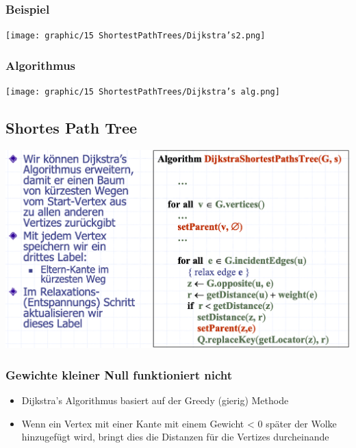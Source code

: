 \subsubsection{Beispiel}
\begin{center}
    \texttt{[image: graphic/15 ShortestPathTrees/Dijkstra’s2.png]}
\end{center}
\vspace{-8pt}

\subsubsection{Algorithmus}
\begin{center}
    \texttt{[image: graphic/15 ShortestPathTrees/Dijkstra’s alg.png]}
\end{center}
\vspace{-8pt}

\subsection{Shortes Path Tree}
\begin{center}
    \includegraphics[scale=.3]{graphic/15 ShortestPathTrees/Kürzester Pfad Bäume.png}
\end{center}
\vspace{-8pt}
\subsubsection{Gewichte kleiner Null funktioniert nicht}
\begin{itemize}
    \item Dijkstra’s Algorithmus basiert auf der Greedy (gierig) Methode
    \item Wenn ein Vertex mit einer Kante mit einem Gewicht < 0 später der Wolke hinzugefügt wird, bringt dies die Distanzen für die Vertizes durcheinande
\end{itemize}


